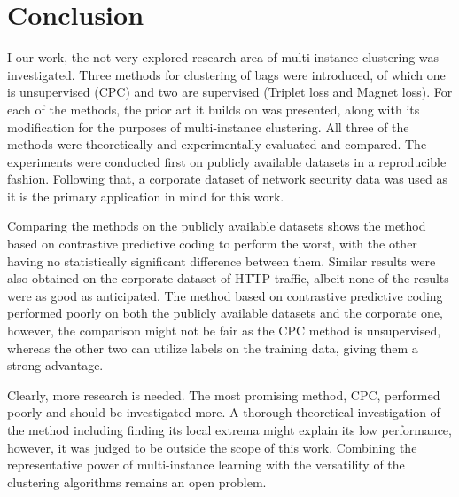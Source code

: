 \section{Conclusion}

I our work, the not very explored research area of multi-instance clustering was investigated. Three methods for clustering of bags were introduced, of which one is unsupervised (CPC) and two are supervised (Triplet loss and Magnet loss). For each of the methods, the prior art it builds on was presented, along with its modification for the purposes of multi-instance clustering. All three of the methods were theoretically and experimentally evaluated and compared. The experiments were conducted first on publicly available datasets in a reproducible fashion. Following that, a corporate dataset of network security data was used as it is the primary application in mind for this work. 

Comparing the methods on the publicly available datasets shows the method based on contrastive predictive coding to perform the worst, with the other having no statistically significant difference between them. Similar results were also obtained on the corporate dataset of HTTP traffic, albeit none of the results were as good as anticipated. The method based on contrastive predictive coding performed poorly on both the publicly available datasets and the corporate one, however, the comparison might not be fair as the CPC method is unsupervised, whereas the other two can utilize labels on the training data, giving them a strong advantage.

Clearly, more research is needed. The most promising method, CPC, performed poorly and should be investigated more. A thorough theoretical investigation of the method including finding its local extrema might explain its low performance, however, it was judged to be outside the scope of this work. Combining the representative power of multi-instance learning with the versatility of the clustering algorithms remains an open problem.
